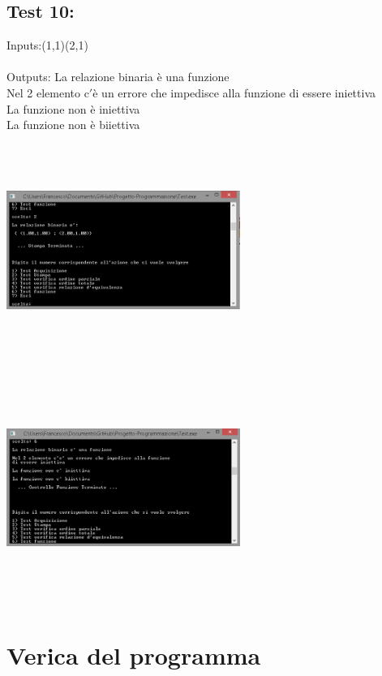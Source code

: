 \documentclass[11pt, a4paper, titlepage, block]{article}
\begin{document}
	\subsection{Test 10:}
	Inputs:(1,1)(2,1)\\
	\\
	Outputs: La relazione binaria \`e  una funzione\\
	Nel 2 elemento c$'$\`e un errore che impedisce alla funzione di essere iniettiva\\
	La funzione non \`e  iniettiva\\
	La funzione non \`e  biiettiva\\
	\includegraphics[width=3in,height=3in,viewport=0 0 300 300]{../Screenshots/Test10Input.png}
	\\
	\includegraphics[width=3in,height=3in,viewport=0 0 300 300]{../Screenshots/Test10Output.PNG}
	\newpage
	\section{Verica del programma}
\end{document}
